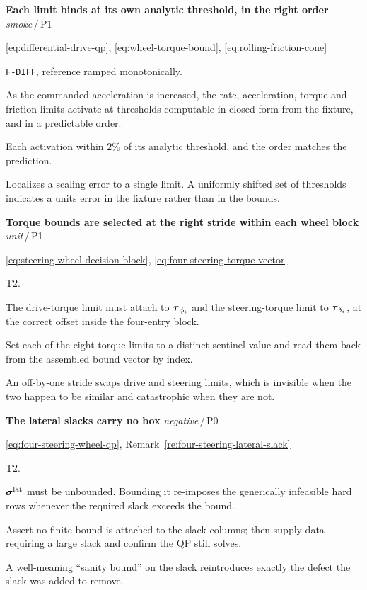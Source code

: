 \documentclass[10pt]{article}
\newcommand{\wheelAngle}{\phi}
\newcommand{\slackVariable}{\bs{\sigma}}
\newenvironment{testcard}[4]{%
  \par\medskip\noindent
  \tBlock{#1}\quad\textbf{#2}%
  \hfill{\small\textit{#3}\,/\,#4}\par\nopagebreak\vspace{2pt}
  \begin{description}[leftmargin=7.5em,style=sameline,itemsep=1pt,topsep=1pt]
}{%
  \end{description}\par\medskip
}
\begin{document}
\begin{testcard}{BND-04}{Each limit binds at its own analytic threshold, in the right order}{smoke}{P1}
  \item[Targets] \eqref{eq:differential-drive-qp},
    \eqref{eq:wheel-torque-bound}, \eqref{eq:rolling-friction-cone}
  \item[Regime] \texttt{F-DIFF}, reference ramped monotonically.
  \item[Invariant] As the commanded acceleration is increased, the rate,
    acceleration, torque and friction limits activate at thresholds computable
    in closed form from the fixture, and in a predictable order.
  \item[Pass] Each activation within $2\%$ of its analytic threshold, and the
    order matches the prediction.
  \item[Diagnosis] Localizes a scaling error to a single limit. A uniformly
    shifted set of thresholds indicates a units error in the fixture rather
    than in the bounds.
\end{testcard}

\begin{testcard}{BND-05}{Torque bounds are selected at the right stride within each wheel block}{unit}{P1}
  \item[Targets] \eqref{eq:steering-wheel-decision-block},
    \eqref{eq:four-steering-torque-vector}
  \item[Regime] T2.
  \item[Invariant] The drive-torque limit must attach to
    $\jtorques_{\wheelAngle_i}$ and the steering-torque limit to
    $\boldsymbol{\tau}_{\delta_i}$, at the correct offset inside the four-entry block.
  \item[Pass] Set each of the eight torque limits to a distinct sentinel value
    and read them back from the assembled bound vector by index.
  \item[Diagnosis] An off-by-one stride swaps drive and steering limits, which
    is invisible when the two happen to be similar and catastrophic when they
    are not.
\end{testcard}

\begin{testcard}{BND-06}{The lateral slacks carry no box}{negative}{P0}
  \item[Targets] \eqref{eq:four-steering-wheel-qp},
    Remark~\ref{re:four-steering-lateral-slack}
  \item[Regime] T2.
  \item[Invariant] $\slackVariable^{\text{lat}}$ must be unbounded. Bounding it
    re-imposes the generically infeasible hard rows whenever the required slack
    exceeds the bound.
  \item[Pass] Assert no finite bound is attached to the slack columns; then
    supply data requiring a large slack and confirm the QP still solves.
  \item[Diagnosis] A well-meaning ``sanity bound'' on the slack reintroduces
    exactly the defect the slack was added to remove.
\end{testcard}
\end{document}
